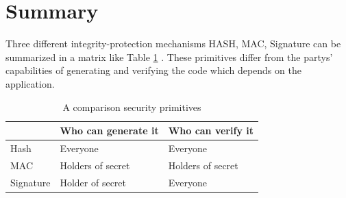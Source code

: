 \section{Summary}
	Three different integrity-protection mechanisms HASH, MAC, Signature can be summarized in a matrix like Table \ref{table:summary} \cite{2002-Stajano-ubiquitous}.
	These primitives differ from the partys' capabilities of generating and verifying the code which depends on the application.
	\begin{table}[!htb]	
		\caption{A comparison security primitives}
		\begin{center}
			\begin{tabular}{ |l || l| l| }
		    \hline
		     & Who can generate it & Who can verify it \\
		    \hline
		    \hline
		    Hash & Everyone & Everyone \\	
		    \hline
		    MAC & Holders of secret & Holders of secret \\
		    \hline
		    Signature & Holder of secret & Everyone \\
		    \hline
			\end{tabular}
		\end{center}
	  \label{table:summary}
	\end{table}



